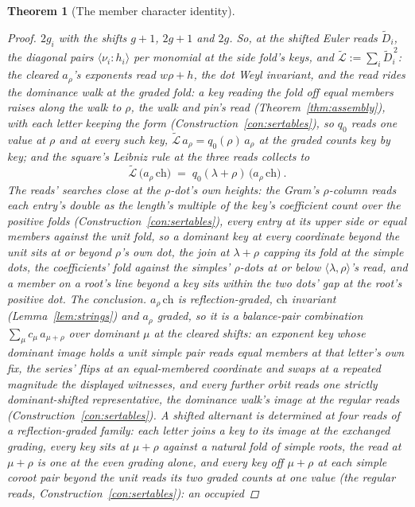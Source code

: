 \documentclass[11pt]{article}
\newtheorem{theorem}{Theorem}
\theoremstyle{definition}
\begin{document}
\begin{theorem}[The member character identity]
\begin{proof}
$2g_i$ with the shifts $g+1$, $2g+1$ and $2g$.
So, at the shifted Euler reads $\tilde D_i$, the diagonal pairs
$\langle\nu_i\!:\!h_i\rangle$ per monomial at the side fold's
keys, and
$\tilde{\mathcal L}:=\sum_i\tilde D_i^{\,2}$: the cleared
$a_\rho$'s exponents read $w\rho+h$, the dot Weyl invariant,
and the read rides the dominance walk at the graded fold: a
key reading the fold off equal members raises along the walk
to $\rho$, the walk and pin's read
(Theorem~\ref{thm:assembly}), with each letter keeping the
form (Construction~\ref{con:sertables}), so $q_0$ reads one
value at $\rho$ and at every such key,
$\tilde{\mathcal L}\,a_\rho=q_0(\rho)\,a_\rho$ at the graded
counts key by key; and the square's Leibniz rule at the three
reads collects to
\[
\tilde{\mathcal L}\,\big(a_\rho\,\mathrm{ch}\big)
\;=\;q_0(\lambda{+}\rho)\,\big(a_\rho\,\mathrm{ch}\big)\ .
\]
The reads' searches close at the $\rho$-dot's own heights: the
Gram's $\rho$-column reads each entry's double as the length's
multiple of the key's coefficient count over the positive folds
(Construction~\ref{con:sertables}), every entry at its upper side
or equal members against the unit fold, so a dominant key at every
coordinate beyond the unit sits at or beyond $\rho$'s own dot, the
join at $\lambda+\rho$ capping its fold at the simple dots, the
coefficients' fold against the simples' $\rho$-dots at or below
$\langle\lambda,\rho\rangle$'s read, and a member on a root's
line beyond a key sits within the two dots' gap at the root's
positive dot.
\emph{The conclusion.} $a_\rho\,\mathrm{ch}$ is
reflection-graded, $\mathrm{ch}$ invariant
(Lemma~\ref{lem:strings}) and $a_\rho$ graded, so it is a
balance-pair combination $\sum_\mu c_\mu\,a_{\mu+\rho}$ over
dominant $\mu$ at
the cleared shifts: an exponent key whose dominant image holds a
unit simple pair reads equal members at that letter's own fix,
the series' flips at an equal-membered coordinate and swaps at a
repeated magnitude the displayed witnesses, and every further
orbit reads one strictly dominant-shifted representative, the
dominance walk's image at the regular reads
(Construction~\ref{con:sertables}). A shifted alternant is
determined at four reads of a reflection-graded family: each
letter joins a key to its image at the exchanged grading,
every key sits at $\mu+\rho$ against a natural fold of simple
roots, the read at $\mu+\rho$ is one at the even grading
alone, and every key off $\mu+\rho$ at each simple coroot pair
beyond the unit reads its two graded counts at one value (the
regular reads, Construction~\ref{con:sertables}): an occupied

\end{proof}
\end{theorem}
\end{document}
